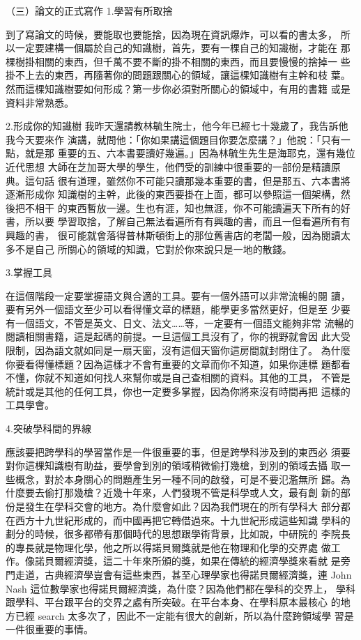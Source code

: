 （三）論文的正式寫作
1.學習有所取捨 

到了寫論文的時候，要能取也要能捨，因為現在資訊爆炸，可以看的書太多，
所以一定要建構一個屬於自己的知識樹，首先，要有一棵自己的知識樹，才能在
那棵樹掛相關的東西，但千萬不要不斷的掛不相關的東西，而且要慢慢的捨掉一
些掛不上去的東西，再隨著你的問題跟關心的領域，讓這棵知識樹有主幹和枝
葉。然而這棵知識樹要如何形成？第一步你必須對所關心的領域中，有用的書籍
或是資料非常熟悉。 

2.形成你的知識樹
我昨天還請教林毓生院士，他今年已經七十幾歲了，我告訴他我今天要來作
演講，就問他：「你如果講這個題目你要怎麼講？」他說：「只有一點，就是那
重要的五、六本書要讀好幾遍。」因為林毓生先生是海耶克，還有幾位近代思想
大師在芝加哥大學的學生，他們受的訓練中很重要的一部份是精讀原典。這句話
很有道理，雖然你不可能只讀那幾本重要的書，但是那五、六本書將逐漸形成你
知識樹的主幹，此後的東西要掛在上面，都可以參照這一個架構，然後把不相干
的東西暫放一邊。生也有涯，知也無涯，你不可能讀遍天下所有的好書，所以要
學習取捨，了解自己無法看遍所有有興趣的書，而且一但看遍所有有興趣的書，
很可能就會落得普林斯頓街上的那位舊書店的老闆一般，因為閱讀太多不是自己
所關心的領域的知識，它對於你來說只是一地的散錢。 


3.掌握工具

在這個階段一定要掌握語文與合適的工具。要有一個外語可以非常流暢的閱
讀，要有另外一個語文至少可以看得懂文章的標題，能學更多當然更好，但是至
少要有一個語文，不管是英文、日文、法文……等，一定要有一個語文能夠非常
流暢的閱讀相關書籍，這是起碼的前提。一旦這個工具沒有了，你的視野就會因
此大受限制，因為語文就如同是一扇天窗，沒有這個天窗你這房間就封閉住了。
為什麼你要看得懂標題？因為這樣才不會有重要的文章而你不知道，如果你連標
題都看不懂，你就不知道如何找人來幫你或是自己查相關的資料。其他的工具，
不管是統計或是其他的任何工具，你也一定要多掌握，因為你將來沒有時間再把
這樣的工具學會。

4.突破學科間的界線

應該要把跨學科的學習當作是一件很重要的事，但是跨學科涉及到的東西必
須要對你這棵知識樹有助益，要學會到別的領域稍微偷打幾槍，到別的領域去攝
取一些概念，對於本身關心的問題產生另一種不同的啟發，可是不要氾濫無所
歸。為什麼要去偷打那幾槍？近幾十年來，人們發現不管是科學或人文，最有創
新的部份是發生在學科交會的地方。為什麼會如此？因為我們現在的所有學科大
部分都在西方十九世紀形成的，而中國再把它轉借過來。十九世紀形成這些知識
學科的劃分的時候，很多都帶有那個時代的思想跟學術背景，比如說，中研院的
李院長的專長就是物理化學，他之所以得諾貝爾獎就是他在物理和化學的交界處
做工作。像諾貝爾經濟獎，這二十年來所頒的獎，如果在傳統的經濟學獎來看就
是旁門走道，古典經濟學豈會有這些東西，甚至心理學家也得諾貝爾經濟獎，連
John Nash 這位數學家也得諾貝爾經濟獎，為什麼？因為他們都在學科的交界上，
學科跟學科、平台跟平台的交界之處有所突破。在平台本身、在學科原本最核心
的地方已經 search 太多次了，因此不一定能有很大的創新，所以為什麼跨領域學
習是一件很重要的事情。

